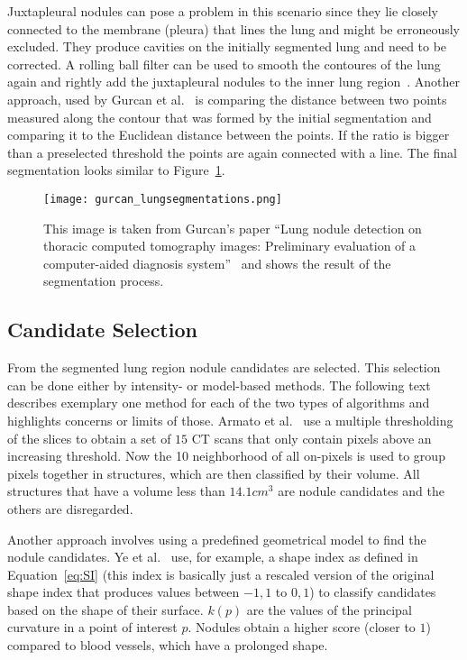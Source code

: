 \documentclass[main.tex]{subfiles}
\begin{document}
Juxtapleural nodules can pose a problem in this scenario since they lie closely connected to the membrane (pleura) that lines the lung and might be erroneously excluded. They produce cavities on the initially segmented lung and need to be corrected. A rolling ball filter can be used to smooth the contoures of the lung again and rightly add the juxtapleural nodules to the inner lung region~\cite{armato1999computerized}. Another approach, used by Gurcan et al.~\cite{gurcan2002lung} is comparing the distance between two points measured along the contour that was formed by the initial segmentation and comparing it to the Euclidean distance between the points. If the ratio is bigger than a preselected threshold the points are again connected with a line. The final segmentation looks similar to Figure~\ref{fig:segmentation}.

\begin{figure}[ht]
\centering
\texttt{[image: gurcan\_lungsegmentations.png]}
\caption{This image is taken from Gurcan's paper ``Lung nodule detection on thoracic computed tomography images: Preliminary evaluation of a computer-aided diagnosis system''~\cite{gurcan2002lung} and shows the result of the segmentation process.}
\label{fig:segmentation}
\end{figure}


\subsection{Candidate Selection}
From the segmented lung region nodule candidates are selected. This selection can be done either by intensity- or model-based methods. The following text describes exemplary one method for each of the two types of algorithms and highlights concerns or limits of those. Armato et al.~\cite{armato1999computerized} use a multiple thresholding of the slices to obtain a set of $15$ CT scans that only contain pixels above an increasing threshold. Now the 10 neighborhood of all on-pixels is used to group pixels together in structures, which are then classified by their volume. All structures that have a volume less than $14.1cm^3$ are nodule candidates and the others are disregarded.

Another approach involves using a predefined geometrical model to find the nodule candidates. Ye et al.~\cite{ye2009shape} use, for example, a shape index as defined in Equation~\ref{eq:SI} (this index is basically just a rescaled version of the original shape index that produces values between $-1,1$ to $0,1$) to classify candidates based on the shape of their surface. $k(p)$ are the values of the principal curvature in a point of interest $p$. Nodules obtain a higher score (closer to $1$) compared to blood vessels, which have a prolonged shape. 
\end{document}
